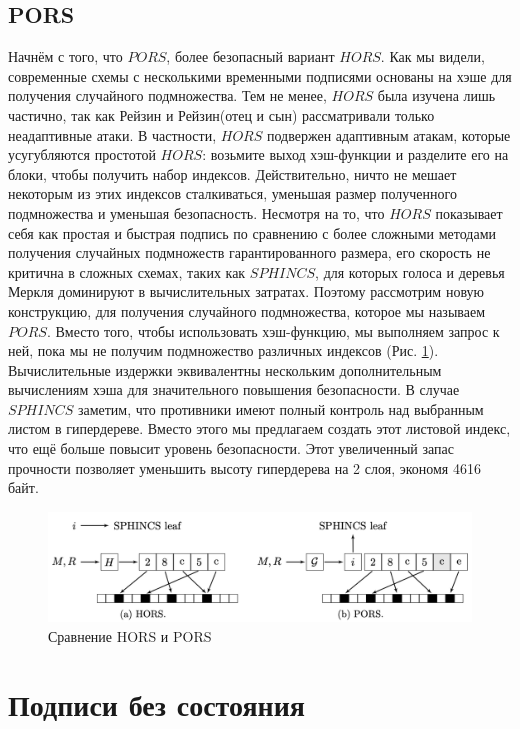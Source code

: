 \documentclass[a4paper, 14pt]{extarticle}
\begin{document}
\subsection{PORS}
Начнём с того, что $PORS$, более безопасный вариант $HORS$. Как мы видели, современные схемы с несколькими временными подписями основаны на хэше для получения случайного подмножества. Тем не менее, $HORS$ была изучена лишь частично, так как Рейзин и Рейзин(отец и сын) рассматривали только неадаптивные атаки. В частности, $HORS$ подвержен адаптивным атакам, которые усугубляются простотой $HORS$: возьмите выход хэш-функции и разделите его на блоки, чтобы получить набор индексов. Действительно, ничто не мешает некоторым из этих индексов сталкиваться, уменьшая размер полученного подмножества и уменьшая безопасность. Несмотря на то, что $HORS$ показывает себя как простая и быстрая подпись по сравнению с более сложными методами получения случайных подмножеств гарантированного размера, его скорость не критична в сложных схемах, таких как $SPHINCS$, для которых голоса и деревья Меркля доминируют в вычислительных затратах. Поэтому рассмотрим новую конструкцию, для получения случайного подмножества, которое мы называем $PORS$. Вместо того, чтобы использовать хэш-функцию, мы выполняем запрос к ней, пока мы не получим подмножество различных индексов (Рис. \ref{fig:pors}). Вычислительные издержки эквивалентны нескольким дополнительным вычислениям хэша для значительного повышения безопасности. В случае $SPHINCS$ заметим, что противники имеют полный контроль над выбранным листом в гипердереве. Вместо этого мы предлагаем создать этот листовой индекс, что ещё больше повысит уровень безопасности. Этот увеличенный запас прочности позволяет уменьшить высоту гипердерева на 2 слоя, экономя 4616 байт.

\begin{figure}[h]
    \centering
    \includegraphics[scale=0.86]{PORS.png}
    \caption{Сравнение HORS и PORS}
    \label{fig:pors}
\end{figure}
\newpage

\section{Подписи без состояния}
\end{document}

